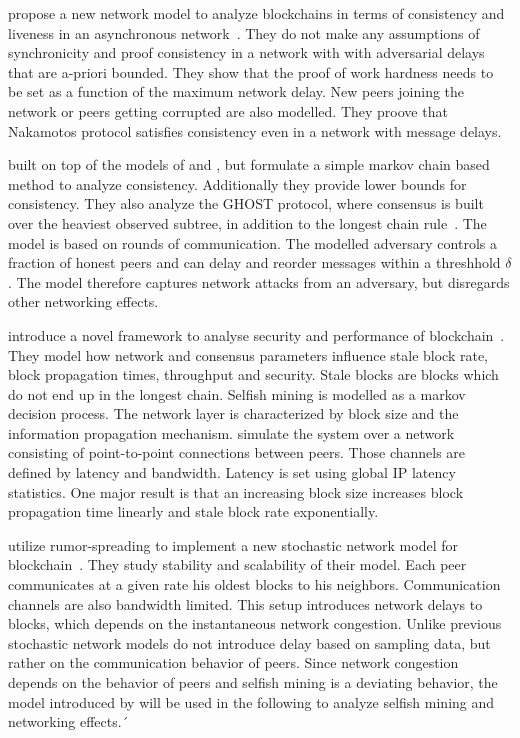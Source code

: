 \citeauthor{pass2017analysis} propose a new network model to analyze blockchains in terms of consistency and liveness in an asynchronous network~\cite{pass2017analysis}. They do not make any assumptions of synchronicity and proof consistency in a network with with adversarial delays that are a-priori bounded. They show that the proof of work hardness needs to be set as a function of the maximum network delay. New peers joining the network or peers getting corrupted are also modelled. They proove that Nakamotos protocol satisfies consistency even in a network with message delays.

\citeauthor{kiffer2018better} built on top of the models of \citeauthor{garay2015bitcoin} and \citeauthor{pass2017analysis}, but formulate a simple markov chain based method to analyze consistency. Additionally they provide lower bounds for consistency. They also analyze the GHOST protocol, where consensus is built over the heaviest observed subtree, in addition to the longest chain rule~\cite{kiffer2018better}. The model is based on rounds of communication. The modelled adversary controls a fraction of honest peers and  can delay and reorder messages within a threshhold $\delta$. The model therefore captures network attacks from an adversary, but disregards other networking effects.

\citeauthor{gervais2016security} introduce a novel framework to analyse security and performance of blockchain~\cite{gervais2016security}. They model how network and consensus parameters influence stale block rate, block propagation times, throughput and security. Stale blocks are blocks which do not end up in the longest chain. Selfish mining is modelled as a markov decision process. The network layer is characterized by block size and the information propagation mechanism. \citeauthor{gervais2016security} simulate the system over a network consisting of point-to-point connections between peers. Those channels are defined by latency and bandwidth. Latency is set using global IP latency statistics. One major result is that an increasing block size increases block propagation time linearly and stale block rate exponentially. 

\citeauthor{gopalan} utilize rumor-spreading to implement a new stochastic network model for blockchain~\cite{gopalan}. They study stability and scalability of their model. Each peer communicates at a given rate his oldest blocks to his neighbors. Communication channels are also bandwidth limited. This setup introduces network delays to blocks, which depends on the instantaneous network congestion.
Unlike previous stochastic network models \citeauthor{gopalan} do not introduce delay based on sampling data, but rather on the communication behavior of peers. Since network congestion depends on the behavior of peers and selfish mining is a deviating behavior, the model introduced by \citeauthor{gopalan} will be used in the following to analyze selfish mining and networking effects.´

